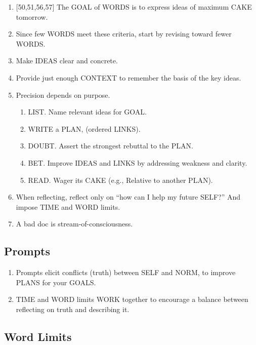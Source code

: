 \documentclass[
]{book}
\providecommand{\tightlist}{%
  \setlength{\itemsep}{0pt}\setlength{\parskip}{0pt}}
\begin{document}
\begin{enumerate}
\def\labelenumi{\arabic{enumi}.}
\tightlist
\item
  {[}50,51,56,57{]} The GOAL of WORDS is to express ideas of maximum CAKE tomorrow.
\item
  Since few WORDS meet these criteria, start by revising toward fewer WORDS.
\item
  Make IDEAS clear and concrete.
\item
  Provide just enough CONTEXT to remember the basis of the key ideas.
\item
  Precision depends on purpose.

  \begin{enumerate}
  \def\labelenumii{\arabic{enumii}.}
  \tightlist
  \item
    LIST. Name relevant ideas for GOAL.
  \item
    WRITE a PLAN, (ordered LINKS).
  \item
    DOUBT. Assert the strongest rebuttal to the PLAN.
  \item
    BET. Improve IDEAS and LINKS by addressing weakness and
    clarity.
  \item
    READ. Wager its CAKE (e.g., Relative to another PLAN).
  \end{enumerate}
\item
  When reflecting, reflect only on ``how can I help my future SELF?'' And
  impose TIME and WORD limits.
\item
  A bad doc is stream-of-consciousness.
\end{enumerate}

\hypertarget{prompts}{%
\subsection{Prompts}\label{prompts}}

\begin{enumerate}
\def\labelenumi{\arabic{enumi}.}
\setcounter{enumi}{7}
\tightlist
\item
  Prompts elicit conflicts (truth) between SELF and NORM, to improve
  PLANS for your GOALS.
\item
  TIME and WORD limits WORK together to encourage a balance
  between reflecting on truth and describing it.
\end{enumerate}

\hypertarget{word-limits}{%
\subsection{Word Limits}\label{word-limits}}
\end{document}
